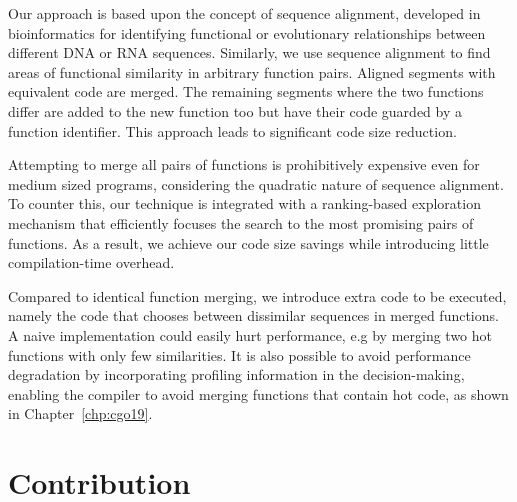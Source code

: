Our approach is based upon the concept of sequence alignment, developed in bioinformatics for identifying functional or evolutionary relationships between different DNA or RNA sequences.
Similarly, we use sequence alignment to find areas of functional similarity in arbitrary function pairs.
Aligned segments with equivalent code are merged.
The remaining segments where the two functions differ are added to the new function too but have their code guarded by a function identifier.
This approach leads to significant code size reduction.

Attempting to merge all pairs of functions is prohibitively expensive even for medium sized programs, considering the quadratic nature of sequence alignment.
To counter this, our technique is integrated with a ranking-based exploration mechanism that efficiently focuses the search to the most
promising pairs of functions. %
As a result, we achieve our code size savings while introducing little compilation-time
overhead.

Compared to identical function merging, we introduce extra code to be executed,
namely the code that chooses between dissimilar sequences in merged functions.
A naive implementation could easily hurt performance, e.g by merging two hot functions
with only few similarities. It is also possible to avoid performance degradation by incorporating
profiling information in the decision-making, enabling the compiler to avoid merging functions that contain hot code, as shown in Chapter~\ref{chp:cgo19}.

\section{Contribution}

